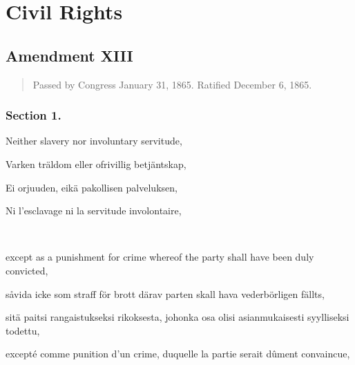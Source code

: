 \documentclass[a4,landscape,12pt]{article}
\begin{document}
\section*{Civil Rights}
\subsection*{Amendment XIII}
\begin{quote}\small
	Passed by Congress January 31, 1865. Ratified December 6, 1865.
\end{quote}
\subsubsection*{Section 1.}
\begin{minipage}[t]{0.22\textwidth}
Neither slavery nor involuntary servitude,
\end{minipage}\textwidth
\begin{minipage}[t]{0.22\textwidth}
Varken träldom eller ofrivillig betjäntskap,
\end{minipage}\textwidth
\begin{minipage}[t]{0.22\textwidth}
Ei orjuuden, eikä pakollisen palveluksen,
\end{minipage}\textwidth
\begin{minipage}[t]{0.22\textwidth}
Ni l'esclavage ni la servitude involontaire,
\end{minipage}

~

\begin{minipage}[t]{0.22\textwidth}
except as a punishment for crime whereof the party shall have been duly convicted,
\end{minipage}\textwidth
\begin{minipage}[t]{0.22\textwidth}
 såvida icke som straff för brott därav parten skall hava vederbörligen fällts, 
\end{minipage}\textwidth
\begin{minipage}[t]{0.22\textwidth}
 sitä paitsi rangaistukseksi rikoksesta, johonka osa olisi asianmukaisesti syylliseksi todettu,
\end{minipage}\textwidth
\begin{minipage}[t]{0.22\textwidth}
excepté comme punition d'un crime, duquelle la partie serait dûment convaincue,
\end{minipage}
\end{document}
